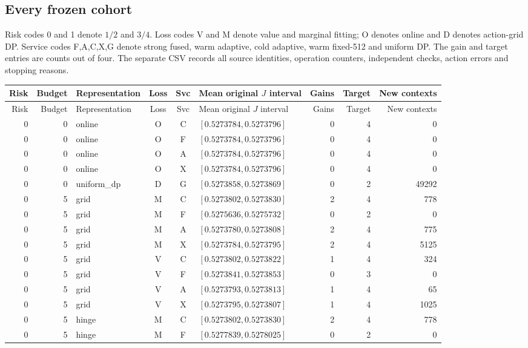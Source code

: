 \subsection{Every frozen cohort}
Risk codes 0 and 1 denote $1/2$ and $3/4$. Loss codes V and M denote value and marginal fitting; O denotes online and D denotes action-grid DP. Service codes F,A,C,X,G denote strong fused, warm adaptive, cold adaptive, warm fixed-512 and uniform DP. The gain and target entries are counts out of four. The separate CSV records all source identities, operation counters, independent checks, action errors and stopping reasons.
\begingroup\scriptsize\setlength{\tabcolsep}{3pt}
\begin{longtable}{r r l c c l r r r}
\hline
Risk & Budget & Representation & Loss & Svc & Mean original $J$ interval & Gains & Target & New contexts \\
\hline\endfirsthead
\hline Risk & Budget & Representation & Loss & Svc & Mean original $J$ interval & Gains & Target & New contexts \\ \hline\endhead
0 & 0 & online & O & C & $[0.5273784,0.5273796]$ & 0 & 4 & 0 \\
0 & 0 & online & O & F & $[0.5273784,0.5273796]$ & 0 & 4 & 0 \\
0 & 0 & online & O & A & $[0.5273784,0.5273796]$ & 0 & 4 & 0 \\
0 & 0 & online & O & X & $[0.5273784,0.5273796]$ & 0 & 4 & 0 \\
0 & 0 & uniform\_dp & D & G & $[0.5273858,0.5273869]$ & 0 & 2 & 49292 \\
0 & 5 & grid & M & C & $[0.5273802,0.5273830]$ & 2 & 4 & 778 \\
0 & 5 & grid & M & F & $[0.5275636,0.5275732]$ & 0 & 2 & 0 \\
0 & 5 & grid & M & A & $[0.5273780,0.5273808]$ & 2 & 4 & 775 \\
0 & 5 & grid & M & X & $[0.5273784,0.5273795]$ & 2 & 4 & 5125 \\
0 & 5 & grid & V & C & $[0.5273802,0.5273822]$ & 1 & 4 & 324 \\
0 & 5 & grid & V & F & $[0.5273841,0.5273853]$ & 0 & 3 & 0 \\
0 & 5 & grid & V & A & $[0.5273793,0.5273813]$ & 1 & 4 & 65 \\
0 & 5 & grid & V & X & $[0.5273795,0.5273807]$ & 1 & 4 & 1025 \\
0 & 5 & hinge & M & C & $[0.5273802,0.5273830]$ & 2 & 4 & 778 \\
0 & 5 & hinge & M & F & $[0.5277839,0.5278025]$ & 0 & 2 & 0 \\

\end{longtable}
